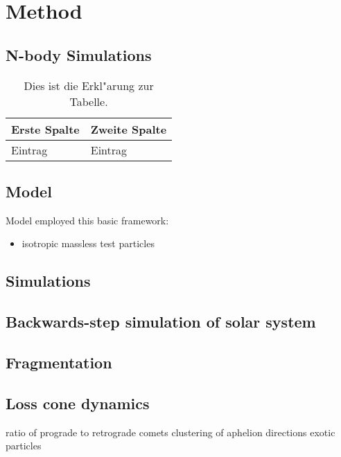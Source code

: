 \chapter{Method}

\lipsum[100]


\section{N-body Simulations}

\lipsum[100]



\begin{table}[htb]
\centering
\begin{tabular}{l|l}
Erste Spalte & Zweite Spalte \\ \hline
Eintrag & Eintrag
\end{tabular}
 \caption[Kurzform f"ur das Tabellenverzeichnis]{Dies ist die Erkl"arung zur Tabelle.}
\end{table}

\section{Model}

Model employed this basic framework:

\begin{itemize}
    \item isotropic massless test particles
\end{itemize}
\section{Simulations}

\section{Backwards-step simulation of solar system}

\section{Fragmentation}

\section{Loss cone dynamics}

ratio of prograde to retrograde comets
clustering of aphelion directions
exotic particles
\cite{1997astro.ph..5153W}